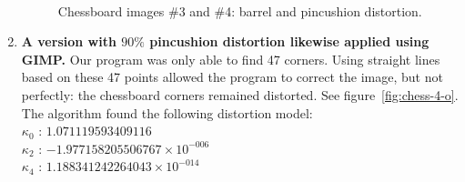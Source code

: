 \begin{enumerate}
\begin{figure}[h]
  \\
  \caption{Chessboard images \#3 and \#4: barrel and pincushion distortion.}
  \label{fig:chess-3-4}
\end{figure}
  \item \textbf{A version with $90\%$ pincushion distortion likewise applied using GIMP.} Our program was only able to find 47 corners. Using straight lines based on these 47 points allowed the program to correct the image, but not perfectly: the chessboard corners remained distorted. See figure~\ref{fig:chess-4-o}. The algorithm found the following distortion model:\\
   $ \kappa_{0}$ : $1.071119593409116$\\
   $ \kappa_{2}$ : $-1.977158205506767 \times 10^{-006}$\\
   $ \kappa_{4}$ : $1.188341242264043 \times 10^{-014}$\\

\end{enumerate}

